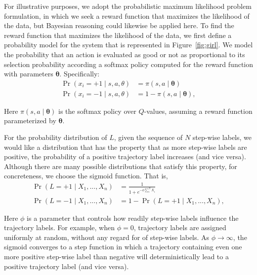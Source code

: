 For illustrative purposes, we adopt the probabilistic maximum
likelihood problem formulation, in which we seek a reward function
that maximizes the likelihood of the data, but Bayesian reasoning
could likewise be applied here.
%
To find the reward function that maximizes the likelihood of the data,
we first define a probability model for the system that is represented
in Figure~\ref{fig:girl}.
%
We model the probability that an action is evaluated as good or not as
proportional to its selection probability according a softmax policy
computed for the reward function with parameters
$\bm{\theta}$. Specifically:
%
\begin{align}
\Pr(x_i = +1 \mid s, a, \theta) &= \pi(s, a \mid \bm{\theta}) \\
\Pr(x_i = -1 \mid s, a, \theta) &= 1 - \pi(s, a \mid \bm{\theta}),
\end{align}

\noindent
Here $\pi(s, a \mid \bm{\theta})$ is the softmax policy over $Q$-values,
assuming a reward function parameterized by $\bm{\theta}$.


For the probability distribution of $L$, given the sequence of $N$
step-wise labels, we would like a distribution that has the property
that as more step-wise labels are positive, the probability of a
positive trajectory label increases (and vice versa). Although there
are many possible distributions that satisfy this property, for
concreteness, we choose the sigmoid function. That is,
%
\begin{align}
\Pr(L = +1 \mid X_1, ..., X_n) &= \frac{1}{1 + e^{-\phi \sum_i^N X_i}} \\
\Pr(L = -1 \mid X_1, ... ,X_n) &= 1 - \Pr(L = +1 \mid X_1, ..., X_n),
\end{align}

\noindent
Here $\phi$ is a parameter that controls how readily step-wise labels
influence the trajectory labels.  For example, when $\phi = 0$,
trajectory labels are assigned uniformly at random, without any regard
for of step-wise labels.  As $\phi \rightarrow \infty$, the sigmoid
converges to a step function in which a trajectory containing even one
more positive step-wise label than negative will deterministically
lead to a positive trajectory label (and vice versa).

